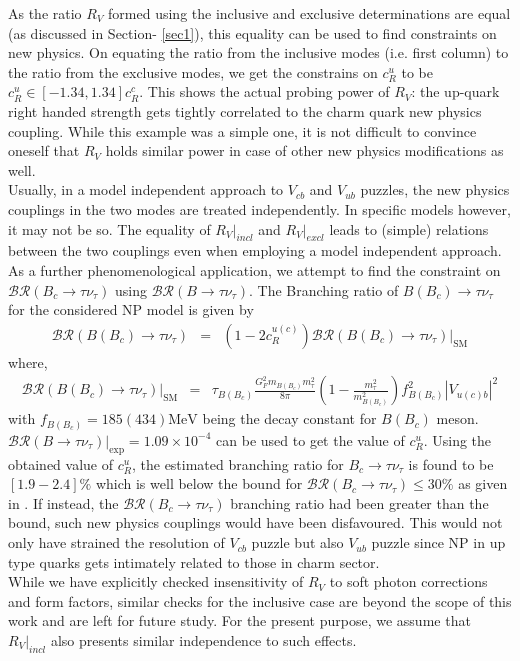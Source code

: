 \documentclass[a4paper,11pt]{article}
\begin{document}
	As the ratio $R_V$ formed using the inclusive and exclusive determinations are equal (as discussed in Section- \ref{sec1}), this equality can be used to find
	constraints on new physics. On equating the ratio from the inclusive modes (i.e. first column) to the ratio from the exclusive modes, we get the constrains on  $c_R^u$ to be $c_R^u \in [-1.34,1.34]c_R^c$. 
	This shows the actual probing power of $R_V$: the up-quark right handed strength gets tightly correlated to the charm quark new
	physics coupling. While this example was a simple one, it is not difficult to convince oneself that $R_V$ holds similar power 
	in case of other new physics modifications as well.  \\
	Usually, in a model independent approach to $V_{cb}$ and $V_{ub}$ puzzles, the new physics couplings
	 in the two modes are treated independently. In specific models however, it may not be so. The equality of $R_V|_{incl}$
	 and $R_V|_{excl}$ leads to (simple) relations between the two couplings even when employing a model independent approach.\\
As a further phenomenological application,  we attempt to find the constraint on  
$\mathcal{BR}(B_c\to \tau \nu_{\tau}) $ using $ \mathcal{BR}(B\to \tau \nu_{\tau})$. The Branching ratio of $B(B_c) \to \tau \nu_{\tau}$
for the considered NP model is given by 
\begin{eqnarray}
\mathcal{BR}(B(B_c) \to \tau \nu_{\tau})&=&(1-2c_R^{u(c)}) \mathcal{BR}(B(B_c) \to \tau \nu_{\tau})|_{\text{SM}}
\end{eqnarray}
where,
\begin{eqnarray}
\mathcal{BR}(B(B_c)\to \tau \nu_{\tau})|_{\text{SM}}&=&\tau_{B(B_{c})}\frac{G_F^2 m_{B(B_c)} m_\tau^2}{8\pi}\left(1-\frac{m_{\tau}^2}{m_{B(B_c)}^2}\right) f_{B(B_c)}^2 |V_{u(c)b}|^2 
\end{eqnarray}
with $f_{B(B_c)}=185(434 )\text{MeV}$ being the decay constant for $B(B_c)$ meson. 
$\mathcal{BR}(B \to \tau \nu_{\tau})|_{\text{exp}}=1.09\times 10^{-4}$ \cite{Zyla:2020zbs} can be used to get the value of $c_R^u$. 
Using the obtained value of $c_R^u$, the estimated branching ratio for $B_c \to \tau \nu_{\tau}$ is found to be $[1.9-2.4]\%$ which is well
below the bound for $\mathcal{BR}(B_c \to \tau \nu_{\tau})\leq30\%$ as given in \cite{Alonso:2016oyd,Fleischer:2021yjo}.
If instead, the $\mathcal{BR}(B_c \to \tau \nu_{\tau})$ branching ratio had been greater than the bound, such new physics couplings
would have been disfavoured. This would not only have strained the resolution of $V_{cb}$ puzzle but also $V_{ub}$ puzzle since NP in up type quarks gets intimately related
to those in charm sector.\\
While we have explicitly checked insensitivity of $R_V$ to soft photon corrections and form factors, similar checks for the inclusive case
are beyond the scope of this work and are left for future study. For the present purpose, we assume that $R_V|_{incl}$ also presents similar
independence to such effects.
\end{document}
